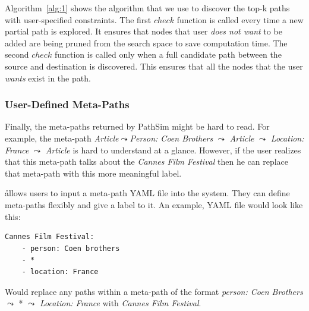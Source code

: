 Algorithm~\ref{alg:1} shows the algorithm that we use to discover the top-k
paths with user-specified constraints. The first $check$ function
is called every time a new partial path is explored. It ensures that nodes
that user \textit{does not want} to be added are being pruned from the search
space to save computation time. The second $check$ function
is called only when a full candidate path between the source and destination
is discovered. This ensures that all the nodes that the user \textit{wants}
exist in the path.

\subsubsection{User-Defined Meta-Paths}
\label{sec:user_metapaths}

Finally, the meta-paths returned by PathSim might be hard to read.
For example, the meta-path \textit{Article}$ \leadsto $\textit{Person: Coen Brothers}
 $\leadsto$ \textit{Article} $\leadsto$ \textit{Location: France} $\leadsto$ \textit{Article} 
is hard to understand at a glance. However, if the user realizes that this meta-path talks
about the \textit{Cannes Film Festival} then he can replace that meta-path with this more 
meaningful label.

\h allows users to input a meta-path YAML file into the system.
They can define meta-paths flexibly and give a label to it. An example, YAML file would look
like this:
\begin{verbatim}
Cannes Film Festival:
    - person: Coen brothers
    - *
    - location: France
\end{verbatim}

Would replace any paths within a meta-path of the format \textit{person: Coen Brothers} 
$\leadsto$ * $\leadsto$ \textit{Location: France} with \textit{Cannes Film Festival}.
